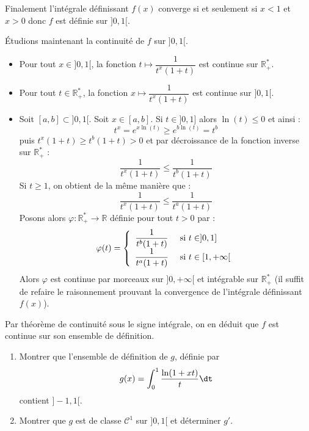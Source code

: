 \documentclass[a4paper,10pt]{report}
\begin{document}
\medskip

\noindent Finalement l'intégrale définissant $f(x)$ converge si et seulement si $x<1$ et $x>0$ donc $f$ est définie sur $]0,1[$.

\medskip

\noindent Étudions maintenant la continuité de $f$ sur $]0,1[$.
\begin{itemize}
\item Pour tout $x \in ]0,1[$, la fonction $t \mapsto \dfrac{1}{t^x(1+t)}$ est continue sur $\mathbb{R}_+^{*}$.
\item Pour tout $t \in \mathbb{R}_+^{*}$, la fonction $x \mapsto  \dfrac{1}{t^x(1+t)}$ est continue sur $]0,1[$.
\item Soit $[a,b] \subset ]0,1[$. Soit $x \in [a,b]$. Si $t \in ]0,1]$ alors $\ln(t) \leq 0$ et ainsi :
$$ t^x = e^{x \ln(t)} \geq e^{b \ln(t)} = t^b$$
puis $t^x(1+t) \geq t^b (1+t)>0$ et par décroissance de la fonction inverse sur $\mathbb{R}_+^{*}$ :
$$ \dfrac{1}{t^x(1+t)} \leq \dfrac{1}{t^b(1+t)}$$
Si $t \geq 1$, on obtient de la même manière que :
$$  \dfrac{1}{t^x(1+t)} \leq \dfrac{1}{t^a(1+t)}$$
Posons alors $\varphi : \mathbb{R}_+^{*} \rightarrow \mathbb{R}$ définie pour tout $t>0$ par :
$$ \varphi(t) = \left\lbrace  \begin{array}{cl}
\dfrac{1}{t^b(1+t)} & \hbox{ si } t \in ]0,1] \\
\dfrac{1}{t^a(1+t)} & \hbox{ si } t \in [1, + \infty[ 
\end{array}\right.$$
Alors $\varphi$ est continue par morceaux sur $]0, + \infty[$ et intégrable sur $\mathbb{R}_+^{*}$ (il suffit de refaire le raisonnement prouvant la convergence de l'intégrale définissant $f(x)$).
\end{itemize}
Par théorème de continuité sous le signe intégrale, on en déduit que $f$ est continue sur son ensemble de définition.



\begin{Exa} 
\begin{enumerate}
\item Montrer que l'ensemble de définition de $g$, définie par 
$$ g(x) = \int_{0}^1 \dfrac{\ln(1+xt)}{t} \dt$$
contient $]-1,1[$.
\item Montrer que $g$ est de classe $\mathcal{C}^1$ sur $]0,1[$ et déterminer $g'$.
\end{enumerate}
\end{Exa}
\end{document}
